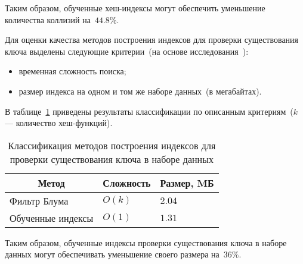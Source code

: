 Таким образом, обученные хеш-индексы могут обеспечить уменьшение количества
коллизий на~$44.8\%$.

Для оценки качества методов построения индексов для проверки существования ключа
выделены следующие критерии~(на основе исследования~\cite{main}):
\begin{itemize}
    \item временная сложность поиска;
    \item размер индекса на одном и том же наборе данных~(в мегабайтах).
\end{itemize}

В таблице~\ref{tab:04} приведены результаты классификации по описанным
критериям~($k$ --- количество хеш-функций).

{
\captionsetup{format=hang,justification=raggedleft,
              singlelinecheck=off,width=17cm}
\begin{longtable}[Hc]{|p{5.3cm}|p{2cm}|p{2cm}|}
\caption{Классификация методов построения индексов для проверки существования
ключа в наборе данных\label{tab:04}}\\
    \hline
    \multicolumn{1}{|c|}{\textbf{Метод}} &
    \multicolumn{1}{c|}{\textbf{Сложность}} &
    \multicolumn{1}{c|}{\textbf{Размер, MБ}}\\
    \hline
    Фильтр Блума
    & $O(k)$
    & $2.04$\\
    \hline
    Обученные индексы
    & $O(1)$
    & $1.31$\\
    \hline
\end{longtable}
}

Таким образом, обученные индексы проверки существования ключа в наборе
данных могут обеспечивать уменьшение своего размера на~$36\%$.
